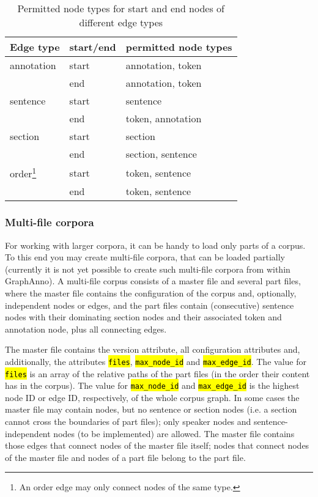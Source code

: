 \documentclass[12pt]{scrartcl}
\newcommand{\code}[1]{\hl{\texttt{#1}}}
\begin{document}
\begin{table}[tb]
	\begin{center}
		\begin{minipage}{20em}
			\begin{tabular*}{20em}{@{\extracolsep{\fill}} lll }
				\toprule
				Edge type & start/end & permitted node types\\
				\midrule
				annotation & start & annotation, token\\
				& end & annotation, token\\
				sentence & start & sentence\\
				& end & token, annotation\\
				section & start & section\\
				& end & section, sentence\\
				order\footnote{An order edge may only connect nodes of the same type.} & start & token, sentence\\
				& end & token, sentence\\
				\bottomrule
			\end{tabular*}
		\end{minipage}
	\end{center}
	\caption{Permitted node types for start and end nodes of different edge types}
	\label{edge-types}
\end{table}


\subsubsection{Multi-file corpora}

For working with larger corpora, it can be handy to load only parts of a corpus.
To this end you may create multi-file corpora, that can be loaded partially (currently it is not yet possible to create such multi-file corpora from within GraphAnno).
A multi-file corpus consists of a master file and several part files, where the master file contains the configuration of the corpus and, optionally, independent nodes or edges, and the part files contain (consecutive) sentence nodes with their dominating section nodes and their associated token and annotation node, plus all connecting edges.

The master file contains the version attribute, all configuration attributes and, additionally, the attributes \code{files}, \code{max\_node\_id} and \code{max\_edge\_id}.
The value for \code{files} is an array of the relative paths of the part files (in the order their content has in the corpus).
The value for \code{max\_node\_id} and \code{max\_edge\_id} is the highest node ID or edge ID, respectively, of the whole corpus graph.
In some cases the master file may contain nodes, but no sentence or section nodes (i.e. a section cannot cross the boundaries of part files); only speaker nodes and sentence-independent nodes (to be implemented) are allowed.
The master file contains those edges that connect nodes of the master file itself; nodes that connect nodes of the master file and nodes of a part file belong to the part file.
\end{document}
